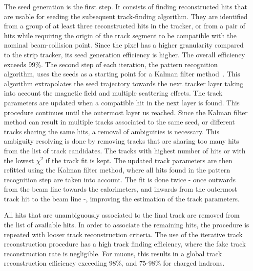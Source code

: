 The seed generation is the first step. It consists of finding reconstructed hits that are usable for seeding the subsequent track-finding algorithm. They are identified from a group of at least three reconstructed hits in the tracker, or from a pair of hits while requiring the origin of the track segment to be compatible with the nominal beam-collision point. Since the pixel has a higher granularity compared to the strip tracker, its seed generation efficiency is higher. The overall efficiency exceeds 99\%.
The second step of each iteration, the pattern recognition algorithm, uses the seeds as a starting point for a Kalman filter method~\cite{FRUHWIRTH1987444,Billoir:1989mh}. This algorithm extrapolates the seed trajectory towards the next tracker layer taking into account the magnetic field and multiple scattering effects. The track parameters are updated when a compatible hit in the next layer is found. This procedure continues until the outermost layer us reached.
Since the Kalman filter method can result in multiple tracks associated to the same seed, or different tracks sharing the same hits, a removal of ambiguities is necessary. This ambiguity resolving is done by removing tracks that are sharing too many hits from the list of track candidates. The tracks with highest number of hits or with the lowest $\chi^2$ if the track fit is kept. 
The updated track parameters are then refitted using the Kalman filter method, where all hits found in the pattern recognition step are taken into account. The fit is done twice - once outwards from the beam line towards the calorimeters, and inwards from the outermost track hit to the beam line -, improving the estimation of the track parameters. 

All hits that are unambiguously associated to the final track are removed from the list of available hits. In order to associate the remaining hits, the procedure is repeated with looser track reconstruction criteria. The use of the iterative track reconstruction procedure has a high track finding efficiency, where the fake track reconstruction rate is negligible. 
For muons, this results in a global track reconstruction efficiency exceeding 98\%, and 75-98\% for charged hadrons. 
